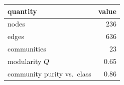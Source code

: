 \begin{tabular}{lr}
\toprule
quantity & value \\
\midrule
nodes & 236 \\
edges & 636 \\
communities & 23 \\
modularity $Q$ & 0.65 \\
community purity vs.\ class & 0.86 \\
\bottomrule
\end{tabular}
